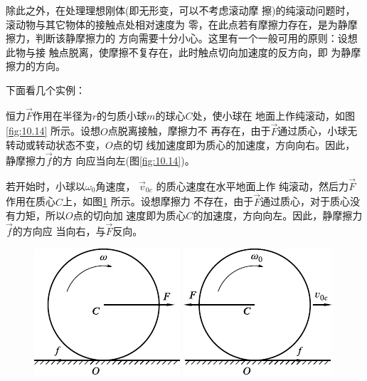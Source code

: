 除此之外，在处理理想刚体(即无形变，可以不考虑滚动摩
擦)的纯滚动问题时，滚动物与其它物体的接触点处相对速度为
零，在此点若有摩擦力存在，是为静摩擦力，判断该静摩擦力的
方向需要十分小心。这里有一个一般可用的原则：设想此物与接
触点脱离，使摩擦不复存在，此时触点切向加速度的反方向，即
为静摩擦力的方向。

下面看几个实例：

恒力$\vec{ F }$作用在半径为$ r $的匀质小球$ m $的球心$ C $处，使小球在
地面上作纯滚动，如图\ref{fig:10.14} 所示。设想$ O $点脱离接触，摩擦力不
再存在，由于$\vec{ F }$通过质心，小球无转动或转动状态不变，$ O $点的切
线加速度即为质心的加速度，方向向右。因此，静摩擦力$ \vec{f} $的方
向应当向左(图\ref{fig:10.14})。

若开始时，小球以$ \omega_{ 0 } $角速度， $ \vec{v} _ { 0c } $ 的质心速度在水平地面上作
纯滚动，然后力$\vec{F}$作用在质心$ C $上，如图\ref{fig:10.15} 所示。设想摩擦力
不存在，由于$\vec{ F }$通过质心，对于质心没有力矩，所以$ O $点的切向加
速度即为质心$ C $的加速度，方向向左。因此，静摩擦力$\vec{f}$的方向应
当向右，与$\vec{F}$反向。

\begin{figure}[h]
  \begin{minipage}{0.5\linewidth}
    \centering
    \includegraphics{figure/fig10.14}
    \caption{}
    \label{fig:10.14}
  \end{minipage}
  \begin{minipage}{0.5\linewidth}
    \centering
    \includegraphics{figure/fig10.15}
    \caption{}
    \label{fig:10.15}
  \end{minipage}
\end{figure}

